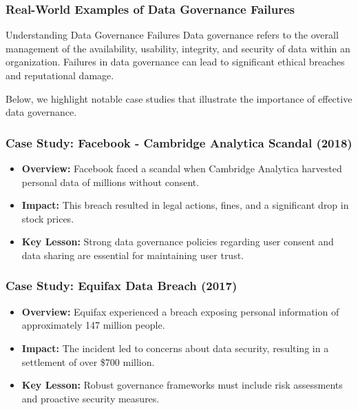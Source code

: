 \documentclass{beamer}
\begin{document}
\begin{frame}[fragile]
    \frametitle{Real-World Examples of Data Governance Failures}

    \begin{block}{Understanding Data Governance Failures}
        Data governance refers to the overall management of the availability, usability, integrity, and security of data within an organization. Failures in data governance can lead to significant ethical breaches and reputational damage.
    \end{block}
    
    Below, we highlight notable case studies that illustrate the importance of effective data governance.
\end{frame}

\begin{frame}[fragile]
    \frametitle{Case Study: Facebook - Cambridge Analytica Scandal (2018)}

    \begin{itemize}
        \item \textbf{Overview:} Facebook faced a scandal when Cambridge Analytica harvested personal data of millions without consent.
        \item \textbf{Impact:} This breach resulted in legal actions, fines, and a significant drop in stock prices.
        \item \textbf{Key Lesson:} Strong data governance policies regarding user consent and data sharing are essential for maintaining user trust.
    \end{itemize}
\end{frame}

\begin{frame}[fragile]
    \frametitle{Case Study: Equifax Data Breach (2017)}

    \begin{itemize}
        \item \textbf{Overview:} Equifax experienced a breach exposing personal information of approximately 147 million people.
        \item \textbf{Impact:} The incident led to concerns about data security, resulting in a settlement of over \$700 million.
        \item \textbf{Key Lesson:} Robust governance frameworks must include risk assessments and proactive security measures.
    \end{itemize}
\end{frame}
\end{document}
